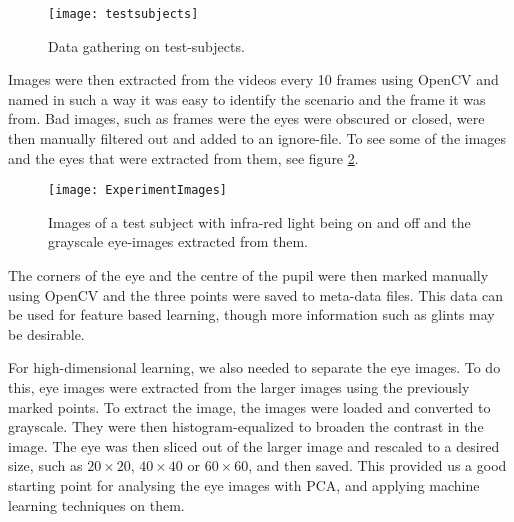 \begin{figure}[h!]
\centering
\texttt{[image: testsubjects]}
\caption{Data gathering on test-subjects.}
\label{fig:testsubjects}
\end{figure}

Images were then extracted from the videos every 10 frames using OpenCV and named in such a way it was easy to identify the scenario and the frame it was from.
Bad images, such as frames were the eyes were obscured or closed, were then manually filtered out and added to an ignore-file.
To see some of the images and the eyes that were extracted from them, see figure \ref{fig:experimentimage}.

\begin{figure}[h!]
\centering
\texttt{[image: ExperimentImages]}
\caption{Images of a test subject with infra-red light being on and off and the grayscale eye-images extracted from them.}
\label{fig:experimentimage}
\end{figure}

The corners of the eye and the centre of the pupil were then marked manually using OpenCV and the three points were saved to meta-data files.
This data can be used for feature based learning, though more information such as glints may be desirable.

For high-dimensional learning, we also needed to separate the eye images.
To do this, eye images were extracted from the larger images using the previously marked points.
To extract the image, the images were loaded and converted to grayscale.
They were then histogram-equalized to broaden the contrast in the image. %
The eye was then sliced out of the larger image and rescaled to a desired size, such as $20\times 20$, $40\times 40$ or $60\times 60$, and then saved.
This provided us a good starting point for analysing the eye images with PCA, and applying machine learning techniques on them.
